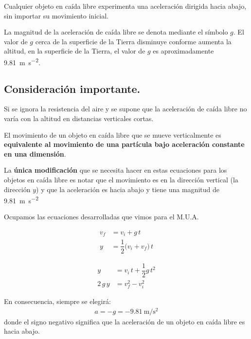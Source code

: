 \documentclass[14pt]{extarticle}
\newcommand{\textocolor}[2]{\textbf{\textcolor{#1}{#2}}}
\begin{document}
Cualquier objeto en caída libre experimenta una aceleración dirigida hacia abajo, sin importar su movimiento inicial.

La magnitud de la aceleración de caída libre se denota mediante el símbolo $g$. El valor de $g$ cerca de la superficie de la Tierra disminuye conforme aumenta la altitud, en la superficie de la Tierra, el valor de $g$ es aproximadamente \SI{9.81}{\meter\per\square\second}.

\subsection{Consideración importante.}

Si se ignora la resistencia del aire  y se supone que la aceleración de caída libre no varía con la altitud en distancias verticales cortas.

El movimiento de un objeto en caída libre que se mueve verticalmente es \textocolor{ao}{equivalente al movimiento de una partícula bajo aceleración constante en una dimensión}.

La \textocolor{carmine}{única modificación} que se necesita hacer en estas ecuaciones para los objetos en caída libre es notar que el movimiento es en la dirección vertical (la dirección $y$)  y que la aceleración es hacia abajo y tiene una magnitud de \SI{9.81}{\meter\per\square\second}

Ocupamos las ecuaciones desarrolladas que vimos para el M.U.A.

\begin{minipage}[t]{0.4\linewidth}
\begin{align*}
v_{f} &= v_{i} + g \, t \\[0.5em]
y &= \dfrac{1}{2} \big( v_{i} + v_{f} \big) \, t
\end{align*}
\end{minipage}
\hspace{1cm}
\begin{minipage}[t]{0.4\linewidth}
\begin{align*}
y &= v_{i} \, t + \dfrac{1}{2} g \, t^{2} \\[0.5em]
2 \, g \, y &= v_{f}^{2} - v_{i}^{2} 
\end{align*}
\end{minipage}

\vspace*{0.5cm}
En consecuencia,  siempre se elegirá:
\begin{align*}
a = - g = - \SI{9.81}{\meter\per\square\second}
\end{align*}
donde el signo negativo significa que la aceleración de un objeto en caída libre es hacia abajo.
\end{document}
